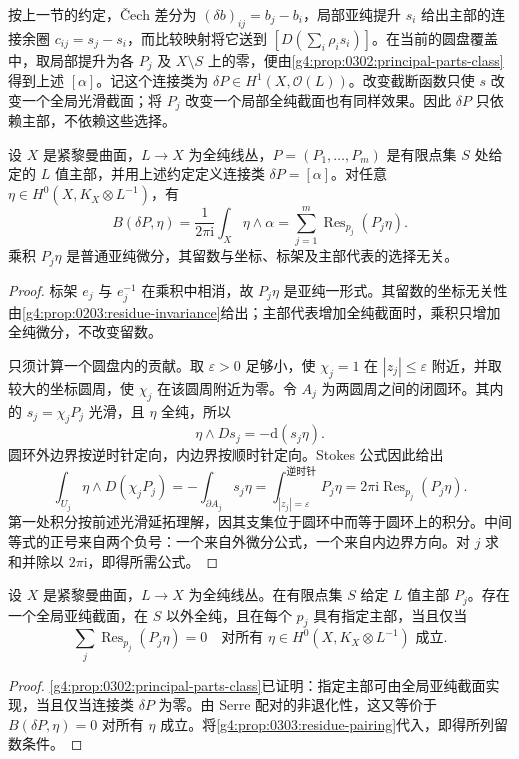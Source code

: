 \ProseParagraphBreak

按上一节的约定，Čech 差分为 \((\delta b)_{ij}=b_j-b_i\)，局部亚纯提升 \(s_i\) 给出主部的连接余圈 \(c_{ij}=s_j-s_i\)，而比较映射将它送到 \([D(\sum_i\rho_i s_i)]\)。在当前的圆盘覆盖中，取局部提升为各 \(P_j\) 及 \(X\setminus S\) 上的零，便由\cref{g4:prop:0302:principal-parts-class}得到上述 \([\alpha]\)。记这个连接类为 \(\delta P\in H^1(X,\mathcal O(L))\)。改变截断函数只使 \(s\) 改变一个全局光滑截面；将 \(P_j\) 改变一个局部全纯截面也有同样效果。因此 \(\delta P\) 只依赖主部，不依赖这些选择。

\begin{proposition}
	\label{g4:prop:0303:residue-pairing}
	设 \(X\) 是紧黎曼曲面，\(L\to X\) 为全纯线丛，\(P=(P_1,\ldots,P_m)\) 是有限点集 \(S\) 处给定的 \(L\) 值主部，并用上述约定定义连接类 \(\delta P=[\alpha]\)。对任意 \(\eta\in H^0(X,K_X\otimes L^{-1})\)，有
	\begin{equation}
		\label{g4:eq:0303:residue-pairing}
		B(\delta P,\eta)
		=\frac1{2\pi\mathrm{i}}\int_X\eta\wedge\alpha
		=\sum_{j=1}^m\operatorname{Res}_{p_j}(P_j\eta).
	\end{equation}
	乘积 \(P_j\eta\) 是普通亚纯微分，其留数与坐标、标架及主部代表的选择无关。
\end{proposition}
\begin{proof}
	标架 \(e_j\) 与 \(e_j^{-1}\) 在乘积中相消，故 \(P_j\eta\) 是亚纯一形式。其留数的坐标无关性由\cref{g4:prop:0203:residue-invariance}给出；主部代表增加全纯截面时，乘积只增加全纯微分，不改变留数。

	只须计算一个圆盘内的贡献。取 \(\varepsilon>0\) 足够小，使 \(\chi_j=1\) 在 \(|z_j|\le\varepsilon\) 附近，并取较大的坐标圆周，使 \(\chi_j\) 在该圆周附近为零。令 \(A_j\) 为两圆周之间的闭圆环。其内的 \(s_j=\chi_jP_j\) 光滑，且 \(\eta\) 全纯，所以
	\[
		\eta\wedge Ds_j=-\mathrm{d}(s_j\eta).
	\]
	圆环外边界按逆时针定向，内边界按顺时针定向。Stokes 公式因此给出
	\[
		\int_{U_j}\eta\wedge D(\chi_jP_j)
		=-\int_{\partial A_j}s_j\eta
		=\int_{|z_j|=\varepsilon}^{\text{逆时针}}P_j\eta
		=2\pi\mathrm{i}\operatorname{Res}_{p_j}(P_j\eta).
	\]
	第一处积分按前述光滑延拓理解，因其支集位于圆环中而等于圆环上的积分。中间等式的正号来自两个负号：一个来自外微分公式，一个来自内边界方向。对 \(j\) 求和并除以 \(2\pi\mathrm{i}\)，即得所需公式。
\end{proof}

\begin{corollary}
	\label{g4:cor:0303:principal-parts-criterion}
	设 \(X\) 是紧黎曼曲面，\(L\to X\) 为全纯线丛。在有限点集 \(S\) 给定 \(L\) 值主部 \(P_j\)。存在一个全局亚纯截面，在 \(S\) 以外全纯，且在每个 \(p_j\) 具有指定主部，当且仅当
	\[
		\sum_j\operatorname{Res}_{p_j}(P_j\eta)=0
		\quad\text{对所有 }\eta\in H^0(X,K_X\otimes L^{-1})\text{ 成立}.
	\]
\end{corollary}
\begin{proof}
	\cref{g4:prop:0302:principal-parts-class}已证明：指定主部可由全局亚纯截面实现，当且仅当连接类 \(\delta P\) 为零。由 Serre 配对的非退化性，这又等价于 \(B(\delta P,\eta)=0\) 对所有 \(\eta\) 成立。将\cref{g4:prop:0303:residue-pairing}代入，即得所列留数条件。
\end{proof}

